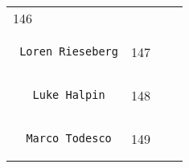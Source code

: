 \documentclass[]{article}
\begin{document}
\begin{longtable}[c]{@{}llll@{}}
\begin{minipage}[t]{0.10\columnwidth}
146
\end{minipage} & \begin{minipage}[t]{0.13\columnwidth}\raggedright
\end{minipage} & \begin{minipage}[t]{0.15\columnwidth}\raggedright
\end{minipage}
\\\noalign{\medskip}
\begin{minipage}[t]{0.39\columnwidth}\raggedright
\begin{verbatim}
 Loren Rieseberg
\end{verbatim}
\end{minipage} & \begin{minipage}[t]{0.10\columnwidth}\raggedright
147
\end{minipage} & \begin{minipage}[t]{0.13\columnwidth}\raggedright
\end{minipage} & \begin{minipage}[t]{0.15\columnwidth}\raggedright
\end{minipage}
\\\noalign{\medskip}
\begin{minipage}[t]{0.39\columnwidth}\raggedright
\begin{verbatim}
   Luke Halpin
\end{verbatim}
\end{minipage} & \begin{minipage}[t]{0.10\columnwidth}\raggedright
148
\end{minipage} & \begin{minipage}[t]{0.13\columnwidth}\raggedright
\end{minipage} & \begin{minipage}[t]{0.15\columnwidth}\raggedright
\end{minipage}
\\\noalign{\medskip}
\begin{minipage}[t]{0.39\columnwidth}\raggedright
\begin{verbatim}
  Marco Todesco
\end{verbatim}
\end{minipage} & \begin{minipage}[t]{0.10\columnwidth}\raggedright
149
\end{minipage} & \begin{minipage}[t]{0.13\columnwidth}\raggedright
\end{minipage} & \begin{minipage}[t]{0.15\columnwidth}\raggedright

\end{minipage}
\end{longtable}
\end{document}
